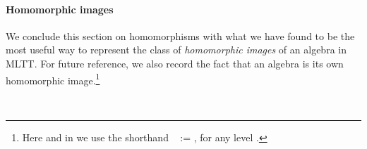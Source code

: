 \ifshort
\vskip2mm
\else
\begin{code}%
\>[0]\AgdaSpace{}%
\AgdaSymbol{=}\AgdaSpace{}%
\AgdaSpace{}%
\AgdaSpace{}%
\<%
\end{code}

\paragraph*{Homomorphic images}
\fi

We conclude this section on homomorphisms with what we have found to be the most useful
way to represent the class of \emph{homomorphic images} of an algebra in MLTT. For future
reference, we also record the fact that an algebra is its own homomorphic
image.\footnote{Here and in \agdaalgebras we use the shorthand ~ := 
   , for any level .}

\begin{code}[hide]%
\>[0]\AgdaSpace{}%
\AgdaSymbol{:}\AgdaSpace{}%
\AgdaSpace{}%
\AgdaSpace{}%
\<%
\\
\>[0]\AgdaSpace{}%
\AgdaSpace{}%
\AgdaSymbol{=}\AgdaSpace{}%
\AgdaSpace{}%
\AgdaSpace{}%
\AgdaSpace{}%
\AgdaSpace{}%
\AgdaSpace{}%
\<%
\end{code}

